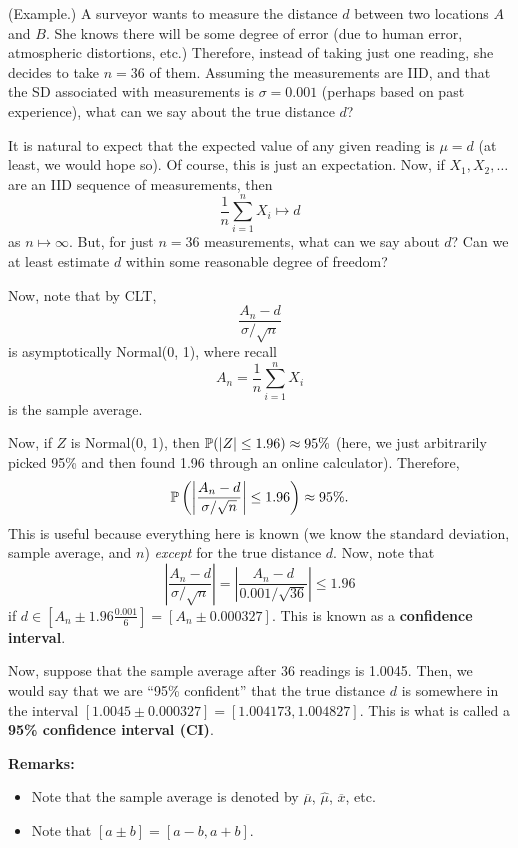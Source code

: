 \begin{mdframed}[]
    (Example.) A surveyor wants to measure the distance $d$ between two locations $A$ and $B$. She knows there will be some degree of error (due to human error, atmospheric distortions, etc.) Therefore, instead of taking just one reading, she decides to take $n = 36$ of them. Assuming the measurements are IID, and that the SD associated with measurements is $\sigma = 0.001$ (perhaps based on past experience), what can we say about the true distance $d$? 

    \bigskip 

    It is natural to expect that the expected value of any given reading is $\mu = d$ (at least, we would hope so). Of course, this is just an expectation. Now, if $X_1, X_2, \dots$ are an IID sequence of measurements, then 
    \[\frac{1}{n} \sum_{i = 1}^{n} X_i \mapsto d\]
    as $n \mapsto \infty$. But, for just $n = 36$ measurements, what can we say about $d$? Can we at least estimate $d$ within some reasonable degree of freedom? 

    \bigskip 

    Now, note that by CLT, \[\frac{A_n - d}{\sigma / \sqrt{n}}\] is asymptotically Normal(0, 1), where recall \[A_n = \frac{1}{n}\sum_{i = 1}^{n} X_i\] is the sample average. 

    \bigskip 

    Now, if $Z$ is Normal(0, 1), then $\mathbb{P}(|Z| \leq 1.96) \approx 95\%$ (here, we just arbitrarily picked 95\% and then found 1.96 through an online calculator). Therefore, 
    \[\mathbb{P}\left(\left|\frac{A_n - d}{\sigma / \sqrt{n}}\right| \leq 1.96\right) \approx 95\%.\]
    This is useful because everything here is known (we know the standard deviation, sample average, and $n$) \emph{except} for the true distance $d$. Now, note that 
    \[\left|\frac{A_n - d}{\sigma / \sqrt{n}}\right| = \left|\frac{A_n - d}{0.001 / \sqrt{36}}\right| \leq 1.96\] 
    if $d \in \left[A_n \pm 1.96 \frac{0.001}{6}\right] = [A_n \pm 0.000327]$. This is known as a \textbf{confidence interval}. 

    \bigskip 

    Now, suppose that the sample average after 36 readings is 1.0045. Then, we would say that we are ``95\% confident'' that the true distance $d$ is somewhere in the interval $[1.0045 \pm 0.000327] = [1.004173, 1.004827]$. This is what is called a \textbf{95\% confidence interval (CI)}.
\end{mdframed}
\textbf{Remarks:}
\begin{itemize}
    \item Note that the sample average is denoted by $\overline{\mu}$, $\hat{\mu}$, $\overline{x}$, etc.
    \item Note that $[a \pm b] = [a - b, a + b]$. 
\end{itemize}

